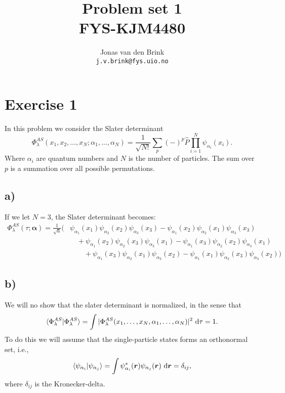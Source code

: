 \documentclass[a4paper, 11pt, notitlepage, english]{article}
\author{Jonas van den Brink \\ \texttt{j.v.brink@fys.uio.no}}
\title{Problem set 1 \\ FYS-KJM4480}
\newcommand{\braket}[2]{\langle #1 | #2 \rangle}
\newcommand{\op}[1]{\hat{#1}}
\renewcommand{\d}{{\rm d}}
\newcommand{\bt}[1]{\boldsymbol{#1}}
\begin{document}
\maketitle

\section*{Exercise 1}

In this problem we consider the Slater determinant
$$\Phi_\lambda^{AS} (x_1, x_2, \ldots, x_N; \alpha_1, \ldots, \alpha_N) = \frac{1}{\sqrt{N!}}\sum_p (-)^p \op{P} \prod_{i=1}^N \psi_{\alpha_i}(x_i).$$
Where $\alpha_i$ are quantum numbers and $N$ is the number of particles. The sum over $p$ is a summation over all possible permutations.

\subsection*{a)}
If we let $N=3$, the Slater determinant becomes:
\begin{align*}   
\Phi_\lambda^{AS}(\tau;\bt{\alpha}) = \frac{1}{\sqrt{6}} \bigg(
&\psi_{\alpha_1}(x_1) \psi_{\alpha_2} (x_2)\psi_{\alpha_3}(x_3)
- \psi_{\alpha_1}(x_2) \psi_{\alpha_2} (x_1)\psi_{\alpha_3}(x_3) \\
&\quad+ \psi_{\alpha_1}(x_2) \psi_{\alpha_2} (x_3)\psi_{\alpha_3}(x_1)  
- \psi_{\alpha_1}(x_3) \psi_{\alpha_2} (x_2)\psi_{\alpha_3}(x_1) \\
&\qquad+ \psi_{\alpha_1}(x_3) \psi_{\alpha_2} (x_1)\psi_{\alpha_3}(x_2) 
- \psi_{\alpha_1}(x_1) \psi_{\alpha_2} (x_3)\psi_{\alpha_3}(x_2)\bigg)
\end{align*}

\subsection*{b)}
We will no show that the slater determinant is normalized, in the sense that
$$\braket{\Phi_\lambda^{AS}}{\Phi_\lambda^{AS}} = \int |\Phi_\lambda^{AS} (x_1,\ldots, x_N, \alpha_1, \ldots, \alpha_N)|^2 \ \d \tau= 1.$$
To do this we will assume that the single-particle states forms an orthonormal set, i.e.,
$$\braket{\psi_{\alpha_i}}{\psi_{\alpha_j}} = \int \psi^*_{\alpha_i}(\bt{r})\psi_{\alpha_j}(\bt{r}) \ \d \bt{r} = \delta_{ij},$$
where $\delta_{ij}$ is the Kronecker-delta.
\end{document}
